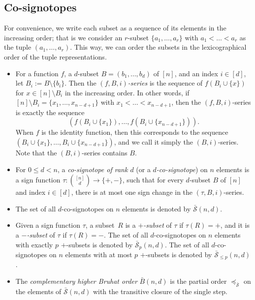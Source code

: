 \documentclass[a4paper,11pt]{amsart}
\newcommand{\binnd}{\binom{[n]}{d}}
\newcommand{\calS}{\mathcal{S}}
\newcommand{\defi}[1]{\textcolor{defblue}{\emph{#1}}}
\begin{document}
\subsection{Co-signotopes}
\label{subsec:co}
For convenience, we write each subset as a sequence of its elements in the increasing order; that is we consider an $r$-subset $\{a_1, \dots, a_r\}$ with $a_1 < \dots < a_r$ as the tuple $(a_1, \dots, a_r)$.
This way, we can order the subsets in the lexicographical order of the tuple representations.

\begin{itemize}
    \item For a function $f$, a $d$-subset $B = (b_1, \dots, b_d)$ of $[n]$, and an index $i \in [d]$, let $B_i := B \setminus \{b_i\}$.
    Then the \defi{$(f,B,i)$-series} is the sequence of $f(B_i \cup \{x\})$ for $x \in [n] \setminus B_i$ in the increasing order.
    In other words, if $[n] \setminus B_i = \{x_1, \dots, x_{n-d+1}\}$ with $x_1 < \dots < x_{n-d+1}$, then the $(f,B,i)$-series is exactly the sequence
    \[
        (f(B_i\cup\{x_1\}), \dots, f(B_i\cup\{x_{n-d+1}\})).
    \]
    When $f$ is the identity function, then this corresponds to the sequence $(B_i\cup\{x_1\}, \dots, B_i\cup\{x_{n-d+1}\})$, and we call it simply the $(B,i)$-series.
    Note that the $(B,i)$-series contains $B$.

    \item For $0\leq d < n$, a \defi{co-signotope of rank $d$} (or a \defi{$d$-co-signotope}) on $n$ elements is a sign function $\tau: \binnd \to \{+,-\}$, such that for every $d$-subset $B$ of $[n]$ and index $i \in [d]$, there is at most one sign change in the $(\tau,B,i)$-series.
    \item The set of all $d$-co-signotopes on $n$ elements is denoted by $\bar{\calS}(n,d)$.
    \item Given a sign function $\tau$, a subset~$R$ is a \defi{$+$-subset} of $\tau$ if $\tau(R)=+$, and it is a \defi{$-$-subset} of $\tau$ if $\tau(R)=-$.
    The set of all $d$-co-signotopes on $n$ elements with exactly $p$ $+$-subsets is denoted by $\bar{\calS}_{p}(n,d)$. 
    The set of all $d$-co-signotopes on $n$ elements with at most $p$ $+$-subsets is denoted by $\bar{\calS}_{\leq p}(n,d)$. 
    
    \item The \defi{complementary higher Bruhat order} $\bar{B}(n,d)$ is the partial order $\preceq_{\bar{\calS}}$ on the elements of $\bar{\calS}(n,d)$ with the transitive closure of the single step.
\end{itemize}
\end{document}
